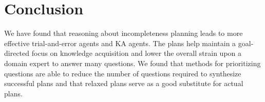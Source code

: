 \documentclass{article}
\begin{document}
% 
% 
% 
% 
% 


\section{Conclusion}

We have found that reasoning about incompleteness planning 
leads to more effective trial-and-error agents and KA agents.  The plans help maintain a
goal-directed focus on knowledge acquisition and lower the overall strain upon a
domain expert to answer many questions.  We found that methods for prioritizing
questions are able to reduce the number of questions required to synthesize
successful plans and that relaxed plans  serve as a good substitute for
actual plans.  

\footnotesize


\end{document}
